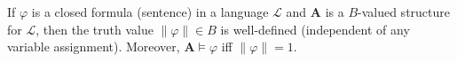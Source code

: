 If $\varphi$ is a closed formula (sentence) in a language $\mathcal{L}$ and $\mathbf{A}$ is a $B$-valued structure for $\mathcal{L}$, then the truth value $\|\varphi\| \in B$ is well-defined (independent of any variable assignment). Moreover, $\mathbf{A} \models \varphi$ iff $\|\varphi\| = 1$.
